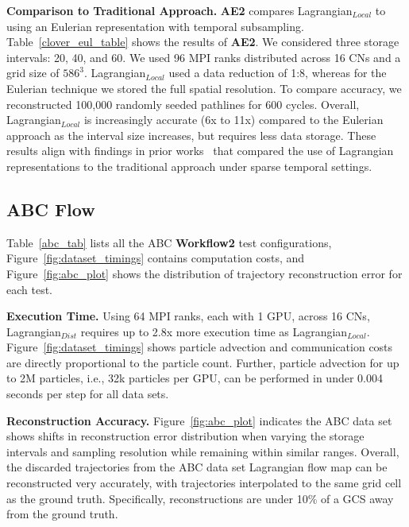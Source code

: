 
\textbf{Comparison to Traditional Approach.}
\textbf{AE2} compares Lagrangian$_{Local}$ to using an Eulerian representation with temporal subsampling.
%
Table~\ref{clover_eul_table} shows the results of \textbf{AE2}.
%
We considered three storage intervals: 20, 40, and 60.
%
We used 96 MPI ranks distributed across 16 CNs and a grid size of $586^3$.
%
Lagrangian$_{Local}$ used a data reduction of 1:8, whereas for the Eulerian technique we stored the full spatial resolution.
%
To compare accuracy, we reconstructed 100,000 randomly seeded pathlines for 600 cycles.
%
%
Overall, Lagrangian$_{Local}$ is increasingly accurate (6x to 11x) compared to the Eulerian approach as the interval size increases, but requires less data storage.
%
These results align with findings in prior works~\cite{agranovsky2014improved, sane2018revisiting} that compared the use of Lagrangian representations to the traditional approach under sparse temporal settings.


\subsection{ABC Flow}
\label{sec:abc}

Table~\ref{abc_tab} lists all the ABC \textbf{Workflow2} test configurations, Figure~\ref{fig:dataset_timings} contains computation costs, and Figure~\ref{fig:abc_plot} shows the distribution of trajectory reconstruction error for each test.
%



\textbf{Execution Time.} Using 64 MPI ranks, each with 1 GPU, across 16 CNs, Lagrangian$_{Dist}$ requires up to 2.8x more execution time as Lagrangian$_{Local}$.
%
Figure~\ref{fig:dataset_timings} shows particle advection and communication costs are directly proportional to the particle count.
%
Further, particle advection for up to 2M particles, i.e., 32k particles per GPU, can be performed in under 0.004 seconds per step for all data sets.
%


\textbf{Reconstruction Accuracy.} Figure~\ref{fig:abc_plot} indicates the ABC data set shows shifts in reconstruction error distribution when varying the storage intervals and sampling resolution while remaining within similar ranges.
%
Overall, the discarded trajectories from the ABC data set Lagrangian flow map can be reconstructed very accurately, with trajectories interpolated to the same grid cell as the ground truth.
%
Specifically, reconstructions are under 10\% of a GCS away from the ground truth.
%

